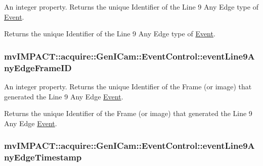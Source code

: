 An integer property. Returns the unique Identifier of the Line 9 Any Edge type of \hyperlink{classmv_i_m_p_a_c_t_1_1acquire_1_1_event}{Event}. 

Returns the unique Identifier of the Line 9 Any Edge type of \hyperlink{classmv_i_m_p_a_c_t_1_1acquire_1_1_event}{Event}. \hypertarget{classmv_i_m_p_a_c_t_1_1acquire_1_1_gen_i_cam_1_1_event_control_a6054e9377f04b589407149daaf4b4be0}{
\subsubsection[{event\+Line9\+Any\+Edge\+Frame\+I\+D}]{ mv\+I\+M\+P\+A\+C\+T\+::acquire\+::\+Gen\+I\+Cam\+::\+Event\+Control\+::event\+Line9\+Any\+Edge\+Frame\+I\+D}}\label{classmv_i_m_p_a_c_t_1_1acquire_1_1_gen_i_cam_1_1_event_control_a6054e9377f04b589407149daaf4b4be0}


An integer property. Returns the unique Identifier of the Frame (or image) that generated the Line 9 Any Edge \hyperlink{classmv_i_m_p_a_c_t_1_1acquire_1_1_event}{Event}. 

Returns the unique Identifier of the Frame (or image) that generated the Line 9 Any Edge \hyperlink{classmv_i_m_p_a_c_t_1_1acquire_1_1_event}{Event}. \hypertarget{classmv_i_m_p_a_c_t_1_1acquire_1_1_gen_i_cam_1_1_event_control_a8dac353643c31e8f7639d9c344a4b6e3}{
\subsubsection[{event\+Line9\+Any\+Edge\+Timestamp}]{ mv\+I\+M\+P\+A\+C\+T\+::acquire\+::\+Gen\+I\+Cam\+::\+Event\+Control\+::event\+Line9\+Any\+Edge\+Timestamp}}\label{classmv_i_m_p_a_c_t_1_1acquire_1_1_gen_i_cam_1_1_event_control_a8dac353643c31e8f7639d9c344a4b6e3}


